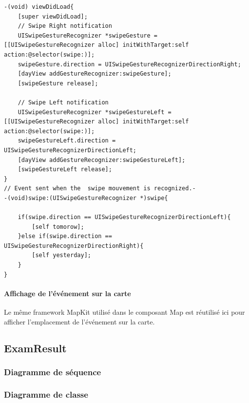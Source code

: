 \begin{lstlisting}[name=Recherche dans UITableView  , label=searchTBV]
-(void) viewDidLoad{
    [super viewDidLoad];
    // Swipe Right notification
    UISwipeGestureRecognizer *swipeGesture = [[UISwipeGestureRecognizer alloc] initWithTarget:self action:@selector(swipe:)];
    swipeGesture.direction = UISwipeGestureRecognizerDirectionRight;
    [dayView addGestureRecognizer:swipeGesture];
    [swipeGesture release];
    
    // Swipe Left notification
    UISwipeGestureRecognizer *swipeGestureLeft = [[UISwipeGestureRecognizer alloc] initWithTarget:self action:@selector(swipe:)];
    swipeGestureLeft.direction = UISwipeGestureRecognizerDirectionLeft;
    [dayView addGestureRecognizer:swipeGestureLeft];
    [swipeGestureLeft release];
}
// Event sent when the  swipe mouvement is recognized.-
-(void)swipe:(UISwipeGestureRecognizer *)swipe{
    
    if(swipe.direction == UISwipeGestureRecognizerDirectionLeft){
        [self tomorow];
    }else if(swipe.direction == UISwipeGestureRecognizerDirectionRight){
        [self yesterday];   
    }
}
\end{lstlisting}
				\paragraph{Affichage de l'événement sur la carte}  Le même framework MapKit utilisé dans le composant Map est réutilisé ici pour afficher l'emplacement de l'événement sur la carte.

	\subsection{ExamResult}
					\subsubsection*{Diagramme de séquence}

					\subsubsection*{Diagramme de classe}
						 	

